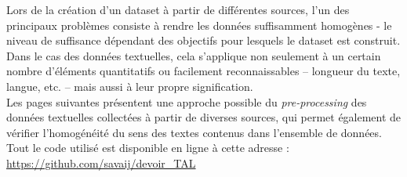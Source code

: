Lors de la création d'un dataset à partir de différentes sources, l'un des principaux problèmes consiste à rendre les données suffisamment homogènes - le niveau de suffisance dépendant des objectifs pour lesquels le dataset est construit. Dans le cas des données textuelles, cela s'applique non seulement à un certain nombre d'éléments quantitatifs ou facilement reconnaissables – longueur du texte, langue, etc. – mais aussi à leur propre signification.\\

 Les pages suivantes présentent une approche possible du \emph{pre-processing} des données textuelles collectées à partir de diverses sources, qui permet également de vérifier l'homogénéité du sens des textes contenus dans l'ensemble de données.\\
 
 Tout le code utilisé est disponible en ligne à cette adresse : \url{https://github.com/savaij/devoir_TAL}
